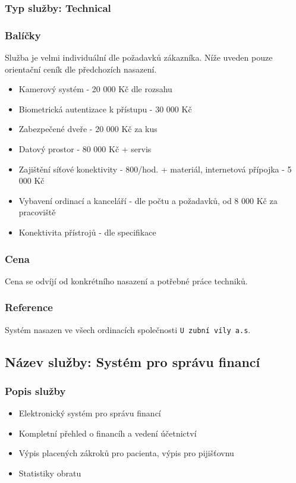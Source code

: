 \documentclass[11pt, a4paper, titlepage]{article}
\begin{document}
	\subsubsection*{Typ služby: Technical}

	\subsubsection*{Balíčky}
	Služba je velmi individuální dle požadavků zákazníka. Níže uveden pouze orientační ceník dle předchozích nasazení. 

	\begin{itemize}
		\item Kamerový systém - 20 000 Kč dle rozsahu
		\item Biometrická autentizace k přístupu - 30 000 Kč
		\item Zabezpečené dveře - 20 000 Kč za kus
		\item Datový prostor - 80 000 Kč + servis
		\item Zajištění síťové konektivity - 800/hod. + materiál, internetová přípojka - 5 000 Kč
		\item Vybavení ordinací a kanceláří - dle počtu a požadavků, od 8 000 Kč za pracoviště
		\item Konektivita přístrojů - dle specifikace
	\end{itemize}

	\subsubsection*{Cena}
	Cena se odvíjí od konkrétního nasazení a potřebné práce techniků.

	\subsubsection*{Reference}
	Systém nasazen ve všech ordinacích společnosti \texttt{U zubní víly a.s}.

	\subsection*{Název služby: Systém pro správu financí}

	\subsubsection*{Popis služby}
	\begin{itemize}
		\item Elektronický systém pro správu financí
		\item Kompletní přehled o financíh a vedení účetnictví
		\item Výpis placených zákroků pro pacienta, výpis pro pijišťovnu
		\item Statistiky obratu
	\end{itemize}
\end{document}
